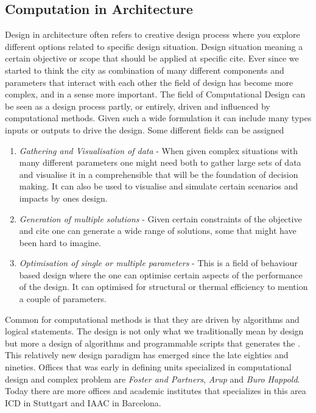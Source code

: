 \subsection{Computation in Architecture}

Design in architecture often refers to creative design process where you explore different options related to specific design situation. Design situation meaning a certain objective or scope that should be applied at specific cite. Ever since we started to think the city as combination of many different components and parameters that interact with each other the field of design has become more complex, and in a sense more important. The field of Computational Design can be seen as a design process partly, or entirely, driven and influenced by computational methods. Given such a wide formulation it can include many types inputs or outputs to drive the design. Some different fields can be assigned

\begin{enumerate}
\item \textit{Gathering and Visualisation of data} - When given complex situations with many different parameters one might need both to gather large sets of data and visualise it in a comprehensible that will be the foundation of decision making. It can also be used to visualise and simulate certain scenarios and impacts by ones design. 
\item \textit{Generation of multiple solutions} -  Given certain constraints of the objective and cite one can generate a wide range of solutions, some that might have been hard to imagine.
\item \textit{Optimisation of single or multiple parameters} - This is a field of behaviour based design where the one can optimise certain aspects of the performance of the design. It can optimised for structural or thermal efficiency to mention a couple of parameters.
\end{enumerate}

Common for computational methods is that they are driven by algorithms and logical statements. The design is not only what we traditionally mean by design but more a design of algorithms and programmable scripts that generates the . This relatively new design paradigm has emerged since the late eighties and nineties. Offices  that was early in defining units specialized in computational design and complex problem are \textit{Foster and Partners},\textit{ Arup} and \textit{Buro Happold}. Today there are more offices and academic institutes that specializes in this area ICD in Stuttgart and IAAC in Barcelona.

